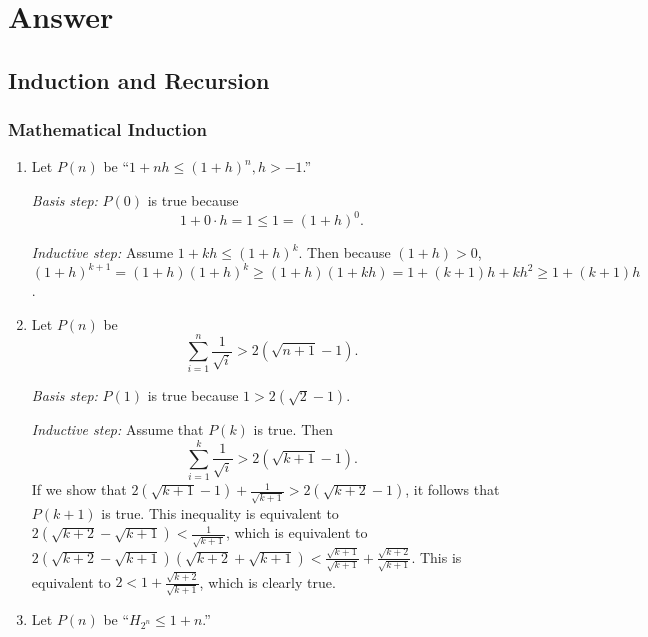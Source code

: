 \documentclass{../../cls/sig-alternate-05-2015}
\begin{document}
\nocite{*}

 
\clearpage
\appendix
\section{Answer}
\subsection{Induction and Recursion}
\subsubsection{Mathematical Induction}
\begin{enumerate}
\item Let $P(n)$ be ``$1 + nh \le (1 + h)^n, h > -1$.''

\textit{Basis step:} $P(0)$ is true because \begin{equation}
	1 + 0 \cdot h = 1 \le 1 = (1 + h)^0.
\end{equation}

\textit{Inductive step:} Assume $1 + kh \le (1 + h)^k$.
Then because $(1 + h) > 0$, $(1 + h)^{k + 1} = (1 + h) (1 + h) ^k \ge (1 + h)(1 + k h) = 1 + (k + 1) h + k h^2 \ge 1 + (k + 1) h$.

\item Let $P(n)$ be \begin{equation}
\sum_{i = 1}^{n} \frac{1}{\sqrt{i}} > 2(\sqrt{n + 1} - 1).
\end{equation}

\textit{Basis step:} $P(1)$ is true because $1 > 2 (\sqrt{2} - 1)$.

\textit{Inductive step:} Assume that $P(k)$ is true.
Then \begin{equation}
\sum_{i = 1}^{k} \frac{1}{\sqrt{i}} > 2(\sqrt{k + 1} - 1).
\end{equation}
If we show that $2(\sqrt{k + 1} - 1) + \frac{1}{\sqrt{k + 1}} > 2(\sqrt{k + 2} - 1)$,
it follows that $P(k + 1)$ is true.
This inequality is equivalent to $2(\sqrt{k + 2} - \sqrt{k + 1}) < \frac{1}{\sqrt{k + 1}}$,
which is equivalent to $2(\sqrt{k + 2} - \sqrt{k + 1}) (\sqrt{k + 2} + \sqrt{k + 1}) < \frac{\sqrt{k + 1}}{\sqrt{k + 1}} + \frac{\sqrt{k + 2}}{\sqrt{k + 1}}$.
This is equivalent to $2 < 1 + \frac{\sqrt{k + 2}}{\sqrt{k + 1}}$,
which is clearly true.

\item Let $P(n)$ be ``$H_{2^n} \le 1 + n$.''


\end{enumerate}
\end{document}
